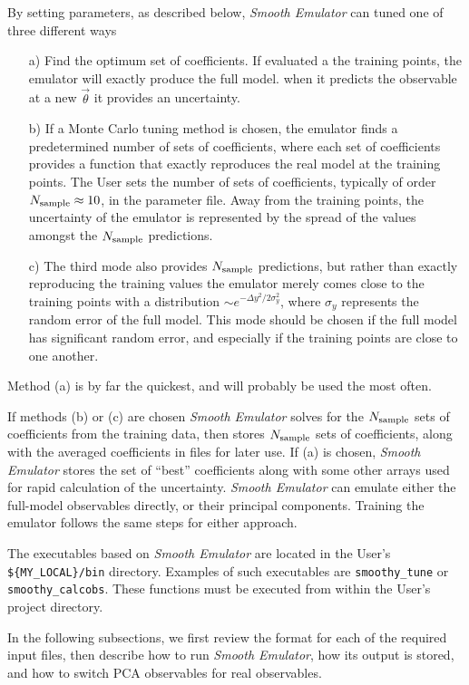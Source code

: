 \documentclass[UserManual.tex]{subfiles}
\begin{document}
By setting parameters, as described below, {\it Smooth Emulator} can tuned one of three different ways
\begin{itemize}\itemsep=0pt
\item[a)] Find the optimum set of coefficients. If evaluated a the training points, the emulator will exactly produce the full model. when it predicts the observable at a new $\vec{\theta}$ it provides an uncertainty.
\item[b)] If a Monte Carlo tuning method is chosen, the emulator finds a predetermined number of sets of coefficients, where each set of coefficients provides a function that exactly reproduces the real model at the training points. The User sets the number of sets of coefficients, typically of order $N_{\rm sample}\approx 10$, in the parameter file. Away from the training points, the uncertainty of the emulator is represented by the spread of the values amongst the $N_{\rm sample}$ predictions.
\item[c)] The third mode also provides $N_{\rm sample}$ predictions, but rather than exactly reproducing the training values the emulator merely comes close to the training points with a distribution $\sim e^{-\Delta y^2/2\sigma_y^2}$, where $\sigma_y$ represents the random error of the full model. This mode should be chosen if the full model has significant random error, and especially if the training points are close to one another.
\end{itemize}
Method (a) is by far the quickest, and will probably be used the most often. 

If methods (b) or (c) are chosen {\it Smooth Emulator} solves for the $N_{\rm sample}$ sets of coefficients from the training data, then stores $N_{\rm sample}$ sets of coefficients, along with the averaged coefficients in files for later use. If (a) is chosen, {\it Smooth Emulator} stores the set of ``best'' coefficients along with some other arrays used for rapid calculation of the uncertainty. {\it Smooth Emulator} can emulate either the full-model observables directly, or their principal components. Training the emulator follows the same steps for either approach. 

The executables based on {\it Smooth Emulator} are located in the User's {\tt \$\{MY\_LOCAL\}/bin} directory. Examples of such executables are {\tt smoothy\_tune} or {\tt smoothy\_calcobs}. These functions must be executed from within the User's project directory. 

In the following subsections, we first review the format for each of the required input files, then describe how to run {\it Smooth Emulator}, how its output is stored, and how to switch PCA observables for real observables.
\end{document}
